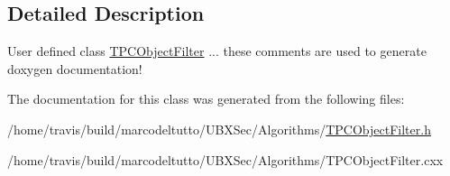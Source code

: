 \subsection{\-Detailed \-Description}
\-User defined class \hyperlink{classubana_1_1TPCObjectFilter}{\-T\-P\-C\-Object\-Filter} ... these comments are used to generate doxygen documentation! 

\-The documentation for this class was generated from the following files\-:\begin{DoxyCompactItemize}
\item 
/home/travis/build/marcodeltutto/\-U\-B\-X\-Sec/\-Algorithms/\hyperlink{TPCObjectFilter_8h}{\-T\-P\-C\-Object\-Filter.\-h}\item 
/home/travis/build/marcodeltutto/\-U\-B\-X\-Sec/\-Algorithms/\-T\-P\-C\-Object\-Filter.\-cxx\end{DoxyCompactItemize}
